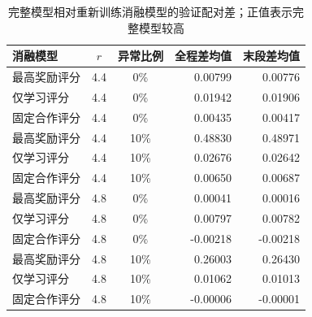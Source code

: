 \begin{table}[!htbp]
\centering\small
\caption{完整模型相对重新训练消融模型的验证配对差；正值表示完整模型较高}
\label{tab:w2-structure-ablation}
\begin{tabular}{lccrr}
\toprule
消融模型 & $r$ & 异常比例 & 全程差均值 & 末段差均值 \\
\midrule
最高奖励评分 & 4.4 & 0\% & 0.00799 & 0.00776 \\
仅学习评分 & 4.4 & 0\% & 0.01942 & 0.01906 \\
固定合作评分 & 4.4 & 0\% & 0.00435 & 0.00417 \\
最高奖励评分 & 4.4 & 10\% & 0.48830 & 0.48971 \\
仅学习评分 & 4.4 & 10\% & 0.02676 & 0.02642 \\
固定合作评分 & 4.4 & 10\% & 0.00650 & 0.00687 \\
最高奖励评分 & 4.8 & 0\% & 0.00041 & 0.00016 \\
仅学习评分 & 4.8 & 0\% & 0.00797 & 0.00782 \\
固定合作评分 & 4.8 & 0\% & -0.00218 & -0.00218 \\
最高奖励评分 & 4.8 & 10\% & 0.26003 & 0.26430 \\
仅学习评分 & 4.8 & 10\% & 0.01062 & 0.01013 \\
固定合作评分 & 4.8 & 10\% & -0.00006 & -0.00001 \\
\bottomrule
\end{tabular}
\par{}
\end{table}
